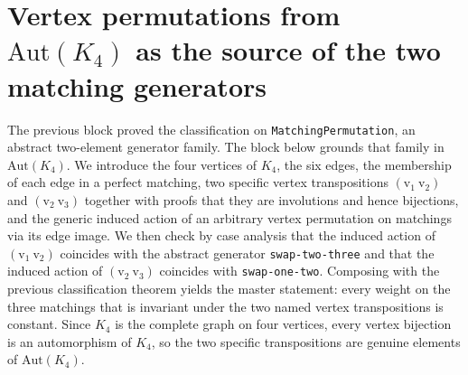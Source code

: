 \documentclass[11pt]{article}
\begin{document}
\section{Vertex permutations from
\texorpdfstring{$\mathrm{Aut}(K_4)$}{Aut(K4)} as the source of the two
matching generators}

The previous block proved the classification on
\texttt{MatchingPermutation}, an abstract two-element generator
family.  The block below grounds that family in
$\mathrm{Aut}(K_4)$.  We introduce the four vertices of $K_4$, the
six edges, the membership of each edge in a perfect matching, two
specific vertex transpositions
$(\mathrm{v_1}\ \mathrm{v_2})$ and $(\mathrm{v_2}\ \mathrm{v_3})$
together with proofs that they are involutions and hence bijections,
and the generic induced action of an arbitrary vertex permutation on
matchings via its edge image.  We then check by case analysis that
the induced action of $(\mathrm{v_1}\ \mathrm{v_2})$ coincides with
the abstract generator \texttt{swap-two-three} and that the induced
action of $(\mathrm{v_2}\ \mathrm{v_3})$ coincides with
\texttt{swap-one-two}.  Composing with the previous classification
theorem yields the master statement: every weight on the three
matchings that is invariant under the two named vertex transpositions
is constant.  Since $K_4$ is the complete graph on four vertices,
every vertex bijection is an automorphism of $K_4$, so the two
specific transpositions are genuine elements of $\mathrm{Aut}(K_4)$.
\end{document}
